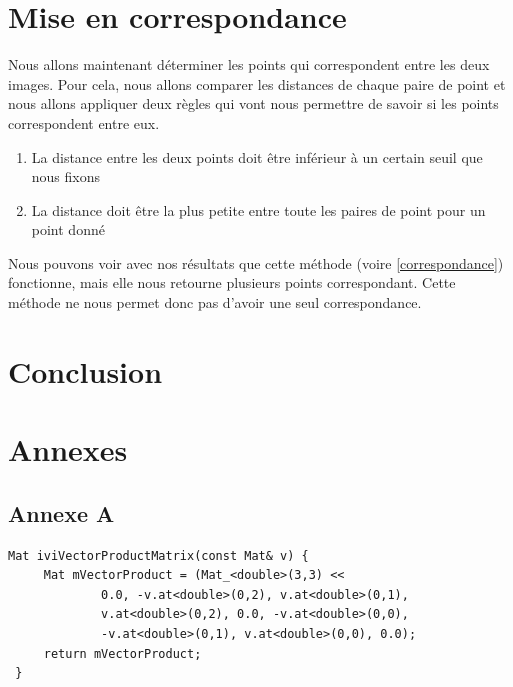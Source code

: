 \documentclass[a4paper,10pt]{article}
\begin{document}
\section{Mise en correspondance}
Nous allons maintenant déterminer les points qui correspondent entre les deux images. Pour cela, nous 
allons comparer les distances de chaque paire de point et nous allons appliquer deux règles qui vont 
nous permettre de savoir si les points correspondent entre eux.
\begin{enumerate}
 \item La distance entre les deux points doit être inférieur à un certain seuil que nous fixons
 \item La distance doit être la plus petite entre toute les paires de point pour un point donné
\end{enumerate}
Nous pouvons voir avec nos résultats que cette méthode (voire \ref{correspondance}) fonctionne, mais elle nous retourne plusieurs
points correspondant. Cette méthode ne nous permet donc pas d'avoir une seul correspondance.

\section{Conclusion}

\section{Annexes}
\subsection{Annexe A}
\label{AproduitVector}
\begin{lstlisting}[caption=Calcul produit vectoriel]
 Mat iviVectorProductMatrix(const Mat& v) {
     Mat mVectorProduct = (Mat_<double>(3,3) <<
             0.0, -v.at<double>(0,2), v.at<double>(0,1),
             v.at<double>(0,2), 0.0, -v.at<double>(0,0),
             -v.at<double>(0,1), v.at<double>(0,0), 0.0);
     return mVectorProduct;
 }
\end{lstlisting}
\end{document}
